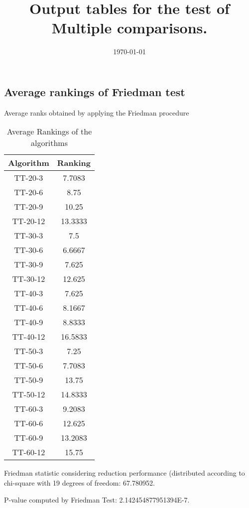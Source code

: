 \documentclass[a4paper,10pt]{article}
\title{Output tables for the test of Multiple comparisons.}
\author{}
\date{\today}
\begin{document}
\begin{landscape}
\pagestyle{empty}
\maketitle
\thispagestyle{empty}
\section{Average rankings of Friedman test}



Average ranks obtained by applying the Friedman procedure

\begin{table}[!htp]
\centering
\begin{tabular}{|c|c|}\hline
Algorithm&Ranking\\\hline
TT-20-3 & 7.7083\\
TT-20-6 & 8.75\\
TT-20-9 & 10.25\\
TT-20-12 & 13.3333\\
TT-30-3 & 7.5\\
TT-30-6 & 6.6667\\
TT-30-9 & 7.625\\
TT-30-12 & 12.625\\
TT-40-3 & 7.625\\
TT-40-6 & 8.1667\\
TT-40-9 & 8.8333\\
TT-40-12 & 16.5833\\
TT-50-3 & 7.25\\
TT-50-6 & 7.7083\\
TT-50-9 & 13.75\\
TT-50-12 & 14.8333\\
TT-60-3 & 9.2083\\
TT-60-6 & 12.625\\
TT-60-9 & 13.2083\\
TT-60-12 & 15.75\\
\hline
\end{tabular}
\caption{Average Rankings of the algorithms}
\end{table}

Friedman statistic considering reduction performance (distributed according to chi-square with 19 degrees of freedom: 67.780952.

P-value computed by Friedman Test: 2.142454877951394E-7.\newline



\pagebreak


\end{landscape}
\end{document}
